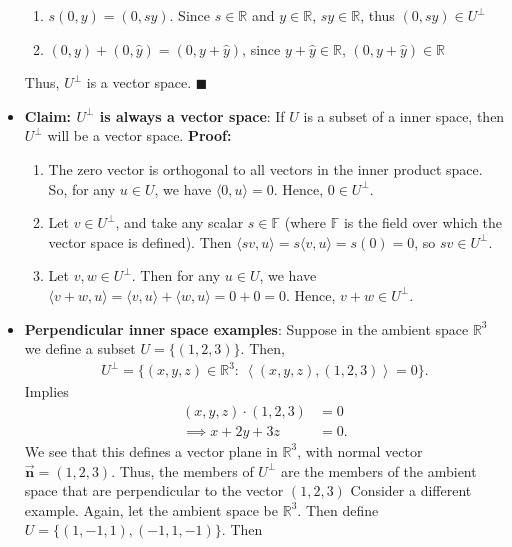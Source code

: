 \documentclass{report}
\begin{document}
\begin{itemize}
\begin{enumerate}
                \item $s(0,y) = (0,sy)$. Since $s\in \mathbb{R}$ and $y\in \mathbb{R}$, $sy \in \mathbb{R}$, thus $(0,sy) \in U^{\perp}$
                \item $(0,y) + (0,\hat{y})  = (0,y + \hat{y})$, since $y + \hat{y} \in \mathbb{R}$, $(0,y+\hat{y}) \in \mathbb{R}$
            \end{enumerate}
            Thus, $U^{\perp}$ is a vector space. $\blacksquare$
        \item \textbf{Claim: $U^{\perp}$ is always a vector space}: If $U$ is a subset of a inner space, then $U^{\perp}$ will be a vector space.
            \bigbreak \noindent 
            \textbf{Proof:}
            \begin{enumerate}
                \item The zero vector is orthogonal to all vectors in the inner product space. So, for any $u \in U$, we have $\langle 0, u \rangle = 0$. Hence, $0 \in U^{\perp}$.
                \item Let $v \in U^{\perp}$, and take any scalar $s \in \mathbb{F}$ (where $\mathbb{F}$ is the field over which the vector space is defined). Then $\langle sv, u \rangle = s\langle v, u \rangle = s(0) = 0$, so $sv \in U^{\perp}$.
                \item Let $v, w \in U^{\perp}$. Then for any $u \in U$, we have $\langle v + w, u \rangle = \langle v, u \rangle + \langle w, u \rangle = 0 + 0 = 0$. Hence, $v + w \in U^{\perp}$.
            \end{enumerate}
        \item \textbf{Perpendicular inner space examples}: Suppose in the ambient space $\mathbb{R}^{3}$ we define a subset $U = \{(1,2,3)\}$. Then,
            \begin{align*}
                U^{\perp} = \{ (x,y,z) \in \mathbb{R}^{3}:\ \left\langle (x,y,z), (1,2,3)  \right\rangle = 0\}
            .\end{align*}
            Implies
            \begin{align*}
                (x,y,z) \cdot (1,2,3) &= 0 \\
                \implies x + 2y + 3z &= 0
            .\end{align*}
            We see that this defines a vector plane in $\mathbb{R}^{3}$, with normal vector $\vec{\mathbf{n}} = (1,2,3)$. Thus, the members of $U^{\perp}$ are the members of the ambient space that are perpendicular to the vector $(1,2,3)$
            \bigbreak \noindent 
            Consider a different example. Again, let the ambient space be $\mathbb{R}^{3}$. Then define $U = \{(1,-1,1), (-1,1,-1)\}$. Then

\end{itemize}
\end{document}
